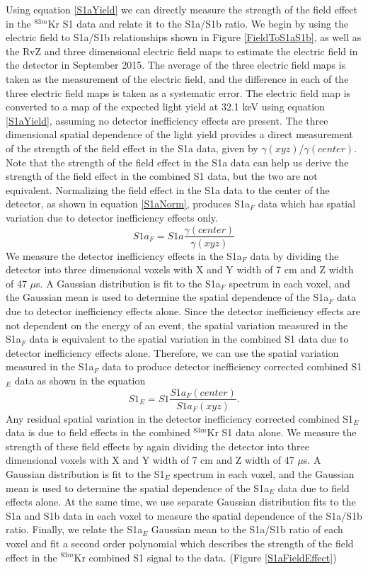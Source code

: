 Using equation \ref{S1aYield} we can directly measure the strength of the field effect in the $^{83m}$Kr S1 data and relate it to the S1a/S1b ratio.  We begin by using the electric field to S1a/S1b relationships shown in Figure \ref{FieldToS1aS1b}, as well as the RvZ and three dimensional electric field maps to estimate the electric field in the detector in September 2015.  The average of the three electric field maps is taken as the measurement of the electric field, and the difference in each of the three electric field maps is taken as a systematic error.  The electric field map is converted to a map of the expected light yield at 32.1 keV using equation \ref{S1aYield}, assuming no detector inefficiency effects are present. The three dimensional spatial dependence of the light yield provides a direct measurement of the strength of the field effect in the S1a data, given by $\gamma(xyz)$/$\gamma(center)$.  Note that the strength of the field effect in the S1a data can help us derive the strength of the field effect in the combined S1 data, but the two are not equivalent.  Normalizing the field effect in the S1a data to the center of the detector, as shown in equation \ref{S1aNorm}, produces S1a$_F$ data which has spatial variation due to detector inefficiency effects only.  
\begin{equation}
S1a_F = S1a \frac{\gamma(center)}{\gamma(xyz)}
\label{S1aNorm}
\end{equation}
We measure the detector inefficiency effects in the S1a$_F$ data by dividing the detector into three dimensional voxels with X and Y width of 7 cm and Z width of 47 $\mu$s.  A Gaussian distribution is fit to the S1a$_F$ spectrum in each voxel, and the Gaussian mean is used to determine the spatial dependence of the S1a$_F$ data due to detector inefficiency effects alone.  Since the detector inefficiency effects are not dependent on the energy of an event, the spatial variation measured in the S1a$_F$ data is equivalent to the spatial variation in the combined S1 data due to detector inefficiency effects alone.  Therefore, we can use the spatial variation measured in the S1a$_F$ data to produce detector inefficiency corrected combined S1$_E$ data as shown in the equation
\begin{equation}
S1_E= S1 \frac{S1a_F(center)}{S1a_F(xyz)}.
\end{equation}
Any residual spatial variation in the detector inefficiency corrected combined S1$_E$ data is due to field effects in the combined $^{83m}$Kr S1 data alone.  We measure the strength of these field effects by again dividing the detector into three dimensional voxels with X and Y width of 7 cm and Z width of 47 $\mu$s.  A Gaussian distribution is fit to the S1$_E$ spectrum in each voxel, and the Gaussian mean is used to determine the spatial dependence of the S1a$_E$ data due to field effects alone.  At the same time, we use separate Gaussian distribution fits to the S1a and S1b data in each voxel to measure the spatial dependence of the S1a/S1b ratio.  Finally, we relate the S1a$_E$ Gaussian mean to the S1a/S1b ratio of each voxel and fit a second order polynomial which describes the strength of the field effect in the $^{83m}$Kr combined S1 signal to the data. (Figure \ref{S1aFieldEffect}) 


